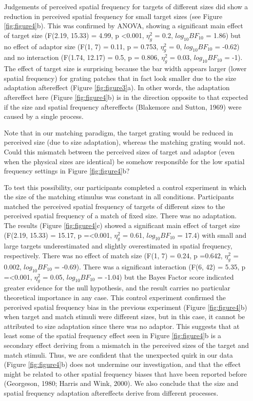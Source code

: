 \documentclass[
]{article}
\begin{document}
Judgements of perceived spatial frequency for targets of different sizes did show a reduction in perceived spatial frequency for small target sizes (see Figure \ref{fig:figure4}b). This was confirmed by ANOVA, showing a significant main effect of target size (F(2.19, 15.33) = 4.99, p \textless0.001, \(\eta^2_g\) = 0.2, \(log_{10}BF_{10}\) = 1.86) but no effect of adaptor size (F(1, 7) = 0.11, p = 0.753, \(\eta^2_g\) = 0, \(log_{10}BF_{10}\) = -0.62) and no interaction (F(1.74, 12.17) = 0.5, p = 0.806, \(\eta^2_g\) = 0.03, \(log_{10}BF_{10}\) = -1). The effect of target size is surprising because the bar width appears larger (lower spatial frequency) for grating patches that in fact look smaller due to the size adaptation aftereffect (Figure \ref{fig:figure3}a). In other words, the adaptation aftereffect here (Figure \ref{fig:figure4}b) is in the direction opposite to that expected if the size and spatial frequency aftereffects (Blakemore and Sutton, 1969) were caused by a single process.

Note that in our matching paradigm, the target grating would be reduced in perceived size (due to size adaptation), whereas the matching grating would not. Could this mismatch between the perceived sizes of target and adaptor (even when the physical sizes are identical) be somehow responsible for the low spatial frequency settings in Figure \ref{fig:figure4}b?

To test this possibility, our participants completed a control experiment in which the size of the matching stimulus was constant in all conditions. Participants matched the perceived spatial frequency of targets of different sizes to the perceived spatial frequency of a match of fixed size. There was no adaptation. The results (Figure \ref{fig:figure4}c) showed a significant main effect of target size (F(2.19, 15.33) = 15.17, p =\textless0.001, \(\eta^2_g\) = 0.61, \(log_{10}BF_{10}\) = 17.4) with small and large targets underestimated and slightly overestimated in spatial frequency, respectively. There was no effect of match size (F(1, 7) = 0.24, p =0.642, \(\eta^2_g\) = 0.002, \(log_{10}BF_{10}\) = -0.69). There was a significant interaction (F(6, 42) = 5.35, p =\textless0.001, \(\eta^2_g\) = 0.05, \(log_{10}BF_{10}\) = -1.04) but the Bayes Factor score indicated greater evidence for the null hypothesis, and the result carries no particular theoretical importance in any case. This control experiment confirmed the perceived spatial frequency bias in the previous experiment (Figure \ref{fig:figure4}b) when target and match stimuli were different sizes, but in this case, it cannot be attributed to size adaptation since there was no adaptor. This suggests that at least some of the spatial frequency effect seen in Figure \ref{fig:figure4}b is a secondary effect deriving from a mismatch in the perceived sizes of the target and match stimuli. Thus, we are confident that the unexpected quirk in our data (Figure \ref{fig:figure4}b) does not undermine our investigation, and that the effect might be related to other spatial frequency biases that have been reported before (Georgeson, 1980; Harris and Wink, 2000). We also conclude that the size and spatial frequency adaptation aftereffects derive from different processes.
\end{document}
